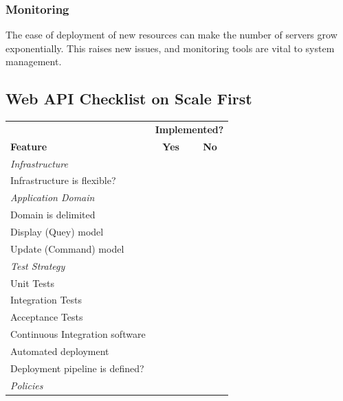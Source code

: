 \documentclass[10pt,article]{IEEEtran}
\begin{document}
\subsubsection{Monitoring}
The ease of deployment of new resources can make the number of servers grow exponentially. This raises new issues, and monitoring tools are vital to system management.


\subsection{Web API Checklist on Scale First}

\newcommand{\ra}[1]{\renewcommand{\arraystretch}{#1}}
\begin{table}[h!]
    \ra{0.98}
    \centering
    \begin{tabular}{lc|c} 
        \toprule[1.5pt]
        & \multicolumn{2}{c}{\textbf{Implemented?}} \\
        \textbf{Feature} & \textbf{Yes} & \textbf{No} \\ \hline
        \emph{Infrastructure} & & \\
        \hspace{0.2cm}Infrastructure is flexible?  & & \\
        \emph{Application Domain} & & \\
        \hspace{0.2cm}Domain is delimited &  & \\
        \hspace{0.2cm}Display (Quey) model &  & \\
        \hspace{0.2cm}Update (Command) model & & \\
        \emph{Test Strategy} & & \\
        \hspace{0.2cm}Unit Tests & & \\
        \hspace{0.2cm}Integration Tests & & \\
        \hspace{0.2cm}Acceptance Tests & & \\
        \hspace{0.2cm}Continuous Integration software & &\\
        Automated deployment & & \\
        \hspace{0.2cm}Deployment pipeline is defined? & &\\ 
        \emph{Policies} & & \\

\end{tabular}
\end{table}
\end{document}
